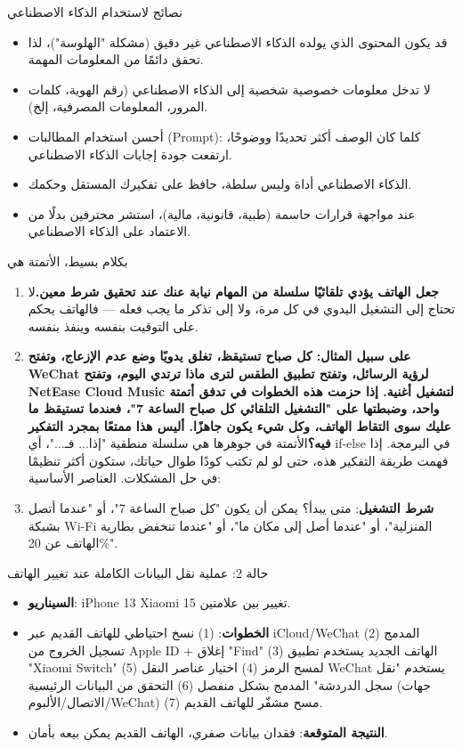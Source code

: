 \begin{tcbinfo}{نصائح لاستخدام الذكاء الاصطناعي}
\begin{itemize}
  \item قد يكون المحتوى الذي يولده الذكاء الاصطناعي غير دقيق (مشكلة "الهلوسة")، لذا تحقق دائمًا من المعلومات المهمة.
  \item لا تدخل معلومات خصوصية شخصية إلى الذكاء الاصطناعي (رقم الهوية، كلمات المرور، المعلومات المصرفية، إلخ).
  \item أحسن استخدام المطالبات (Prompt): كلما كان الوصف أكثر تحديدًا ووضوحًا، ارتفعت جودة إجابات الذكاء الاصطناعي.
  \item الذكاء الاصطناعي أداة وليس سلطة، حافظ على تفكيرك المستقل وحكمك.
  \item عند مواجهة قرارات حاسمة (طبية، قانونية، مالية)، استشر محترفين بدلًا من الاعتماد على الذكاء الاصطناعي.
\end{itemize}

\end{tcbinfo}

\begin{tcbpractice}{بكلام بسيط، الأتمتة هي}
\begin{enumerate}
  \item \textbf{جعل الهاتف يؤدي تلقائيًا سلسلة من المهام نيابة عنك عند تحقيق شرط معين.}لا تحتاج إلى التشغيل اليدوي في كل مرة، ولا إلى تذكر ما يجب فعله — فالهاتف يحكم على التوقيت بنفسه وينفذ بنفسه.
  \item \textbf{على سبيل المثال: كل صباح تستيقظ، تغلق يدويًا وضع عدم الإزعاج، وتفتح WeChat لرؤية الرسائل، وتفتح تطبيق الطقس لترى ماذا ترتدي اليوم، وتفتح NetEase Cloud Music لتشغيل أغنية. إذا حزمت هذه الخطوات في تدفق أتمتة واحد، وضبطتها على "التشغيل التلقائي كل صباح الساعة 7"، فعندما تستيقظ ما عليك سوى التقاط الهاتف، وكل شيء يكون جاهزًا. أليس هذا ممتعًا بمجرد التفكير فيه؟}الأتمتة في جوهرها هي سلسلة منطقية "إذا... فـ..."، أي if-else في البرمجة. إذا فهمت طريقة التفكير هذه، حتى لو لم تكتب كودًا طوال حياتك، ستكون أكثر تنظيمًا في حل المشكلات. العناصر الأساسية:
  \item \textbf{شرط التشغيل}: متى يبدأ؟ يمكن أن يكون "كل صباح الساعة 7"، أو "عندما أتصل بشبكة Wi-Fi المنزلية"، أو "عندما أصل إلى مكان ما"، أو "عندما تنخفض بطارية الهاتف عن 20\%".
\end{enumerate}

\end{tcbpractice}

\begin{tcbinfo}{حالة 2: عملية نقل البيانات الكاملة عند تغيير الهاتف}
\begin{itemize}
  \item \textbf{السيناريو}: iPhone 13 Xiaomi 15 تغيير بين علامتين.
  \item \textbf{الخطوات}: (1) نسخ احتياطي للهاتف القديم عبر iCloud/WeChat المدمج (2) تسجيل الخروج من Apple ID + إغلاق "Find" (3) الهاتف الجديد يستخدم تطبيق "Xiaomi Switch" لمسح الرمز (4) اختيار عناصر النقل (5) WeChat يستخدم "نقل سجل الدردشة" المدمج بشكل منفصل (6) التحقق من البيانات الرئيسية (جهات الاتصال/الألبوم/WeChat) (7) مسح مشفّر للهاتف القديم.
  \item \textbf{النتيجة المتوقعة}: فقدان بيانات صفري، الهاتف القديم يمكن بيعه بأمان.
\end{itemize}

\end{tcbinfo}
